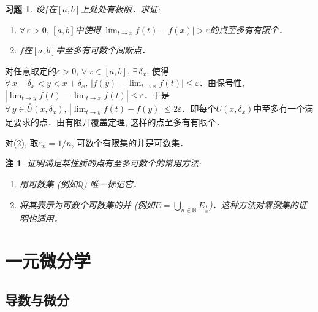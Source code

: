 \documentclass[11pt,a4paper]{ctexart}
\makeatletter
\theoremstyle{thmseries} %
\newtheorem{thm}{定理}[section]
\theoremstyle{exerseries}
\newtheorem{exer}{习题}[section]
\newtheorem*{rem}{注}
\renewenvironment{proof}[1][\proofname]{\par
  \pushQED{\qed}%
  \normalfont \topsep6\p@\@plus6\p@\relax
  \trivlist
  \item[\hskip\labelsep
        \itshape
    #1\@addpunct{}]\ignorespaces
}{%
  \popQED\endtrivlist\@endpefalse
}
\newenvironment{pf}{\begin{proof}[\bfseries\upshape 证\quad]}{\end{proof}}
\newcommand{\bra}[1]{\mathopen{}\left(#1\right)}
\renewcommand{\epsilon}{\varepsilon}
\renewcommand{\phi}{\varphi}
\newcommand{\dnei}{\overset{\circ}{U}}
\newcommand{\N}{\mathbb{N}}
\newcommand{\Q}{\mathbb{Q}}
\makeatother
\begin{document}
\begin{exer}
	设$f$在$[a,b]$上处处有极限．求证:
	\begin{enumerate}
		\item $\forall\,\epsilon>0,\,[a,b]$中使得$|\lim_{t\to x}f(t)-f(x)|>\epsilon$的点至多有有限个．
		\item $f$在$[a,b]$中至多有可数个间断点．
	\end{enumerate}
\end{exer}
\begin{pf}
	对任意取定的$\epsilon>0$, $\forall\,x\in[a,b],\,\exists\,\delta_x$, 使得$\forall\,x-\delta_x<y<x+\delta_x,\,|f(y)-\lim_{t\to x}f(t)|\leq\epsilon$．由保号性, $|\lim_{t\to y}f(t)-\lim_{t\to x}f(t)|\leq\epsilon$．于是$\forall\,y\in\dnei(x,\delta_x),\,|\lim_{t\to y}f(t)-f(y)|\leq2\epsilon$．即每个$U(x,\delta_x)$中至多有一个满足要求的点．由有限开覆盖定理, 这样的点至多有有限个．

	对(2), 取$\epsilon_n=1/n$, 可数个有限集的并是可数集．
\end{pf}
\begin{rem}
	证明满足某性质的点有至多可数个的常用方法:
	\begin{enumerate}
		\item 用可数集 (例如$\Q$) 唯一标记它．
		\item 将其表示为可数个可数集的并 (例如$E=\bigcup_{n\in \N}E_{\frac{1}{n}}$)．这种方法对零测集的证明也适用．
	\end{enumerate}
\end{rem}


\section{一元微分学}
\subsection{导数与微分}

\end{document}
